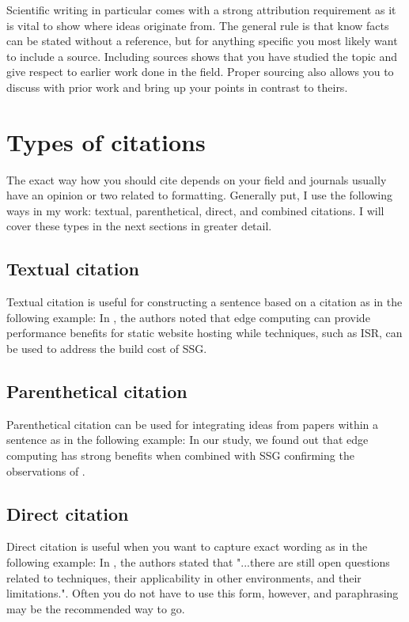 Scientific writing in particular comes with a strong attribution requirement as it is vital to show where ideas originate from.
The general rule is that know facts can be stated without a reference, but for anything specific you most likely want to include a source.
Including sources shows that you have studied the topic and give respect to earlier work done in the field.
Proper sourcing also allows you to discuss with prior work and bring up your points in contrast to theirs.

\section{Types of citations}

The exact way how you should cite depends on your field and journals usually have an opinion or two related to formatting.
Generally put, I use the following ways in my work: textual, parenthetical, direct, and combined citations.
I will cover these types in the next sections in greater detail.

\subsection{Textual citation}

Textual citation is useful for constructing a sentence based on a citation as in the following example: In \citet{vepsalainen2023implications}, the authors noted that edge computing can provide performance benefits for static website hosting while techniques, such as ISR, can be used to address the build cost of SSG.

\subsection{Parenthetical citation}

Parenthetical citation can be used for integrating ideas from papers within a sentence as in the following example: In our study, we found out that edge computing has strong benefits when combined with SSG confirming the observations of \citep{vepsalainen2023implications}.

\subsection{Direct citation}

Direct citation is useful when you want to capture exact wording as in the following example: In \citet{vepsalainen2023implications}, the authors stated that "...there are still open questions related to techniques, their applicability in other environments, and their limitations.".
Often you do not have to use this form, however, and paraphrasing may be the recommended way to go.

